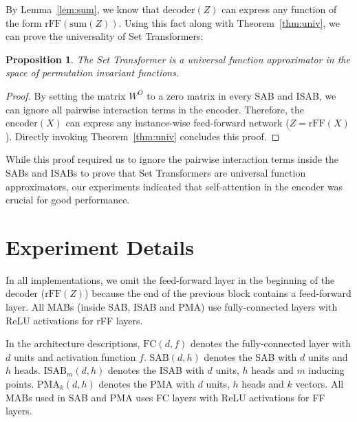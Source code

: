 \documentclass{article}
\newtheorem{proposition}{Proposition}
\begin{document}
By Lemma~\ref{lem:sum}, we know that $\mathrm{decoder}(Z)$ can express any function of the form $\textrm{rFF}(\mathrm{sum}(Z))$.
Using this fact along with Theorem~\ref{thm:univ}, we can prove the universality of Set Transformers:

\begin{proposition}
\label{thm:univ_set}
The Set Transformer is a universal function approximator in the space of permutation invariant functions.
\end{proposition}
\begin{proof}
By setting the matrix $W^O$ to a zero matrix in every SAB and ISAB, we can ignore all pairwise interaction terms in the encoder.
Therefore, the $\mathrm{encoder}(X)$ can express any instance-wise feed-forward network ($Z=\mathrm{rFF}(X)$).
Directly invoking Theorem~\ref{thm:univ} concludes this proof.
\end{proof}

While this proof required us to ignore the pairwise interaction terms inside the SABs and ISABs to prove that Set Transformers are universal function approximators, our experiments indicated that self-attention in the encoder was crucial for good performance.

\section{Experiment Details}
In all implementations, we omit the feed-forward layer in the beginning of the decoder ($\mathrm{rFF}(Z)$) because the end of the previous block contains a feed-forward layer.
All MABs (inside SAB, ISAB and PMA) use fully-connected layers with ReLU activations for rFF layers.

In the architecture descriptions, $\mathrm{FC}(d,f)$ denotes the fully-connected layer with $d$ units and activation function $f$.
$\mathrm{SAB}(d, h)$ denotes the SAB with $d$ units and $h$ heads.
$\mathrm{ISAB}_m(d, h)$ denotes the ISAB with $d$ units, $h$ heads and $m$ inducing points.
$\mathrm{PMA}_k(d, h)$ denotes the PMA with $d$ units, $h$ heads and $k$ vectors. All MABs used in SAB and PMA uses FC layers with ReLU activations for FF layers.

\newcommand{\relu}{\mathrm{ReLU}}
\newcommand{\bn}{\mathrm{BN}}
\newcommand{\fc}{\mathrm{FC}}
\newcommand{\sab}{\mathrm{SAB}}
\newcommand{\isab}{\mathrm{ISAB}}
\newcommand{\pma}{\mathrm{PMA}}
\newcommand{\conv}{\mathrm{Conv}}
\end{document}
